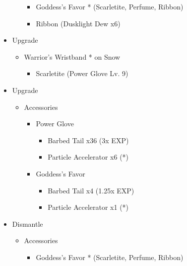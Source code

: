 \begin{paracol}{2}
\begin{upgrade}
\begin{itemize}
\begin{itemize}
			            \begin{itemize}
				            \item Goddess's Favor * (Scarletite, Perfume, Ribbon)
				            \item Ribbon (Dusklight Dew x6)
			            \end{itemize}
		      \end{itemize}
		\item Upgrade
		      \begin{itemize}
			      \item Warrior's Wristband * on Snow
			            \begin{itemize}
				            \item Scarletite (Power Glove Lv. 9)
			            \end{itemize}
		      \end{itemize}
	\end{itemize}
\end{upgrade}
\switchcolumn
\begin{upgrade}
\begin{itemize}
    \item Upgrade
    \begin{itemize}
        \item Accessories
        \begin{itemize}
            \item Power Glove
            \begin{itemize}
                \item Barbed Tail x36 (3x EXP)
                \item Particle Accelerator x6 (*)
            \end{itemize}
            \item Goddess's Favor
            \begin{itemize}
                \item Barbed Tail x4 (1.25x EXP)
                \item Particle Accelerator x1 (*)
            \end{itemize}
        \end{itemize}
    \end{itemize}
    \item Dismantle
    \begin{itemize}
        \item Accessories
        \begin{itemize}
            \item Goddess's Favor * (Scarletite, Perfume, Ribbon)

\end{itemize}
\end{itemize}
\end{itemize}
\end{upgrade}
\end{paracol}
